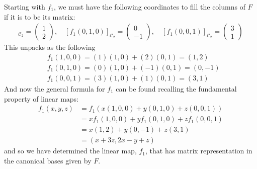 {\noindent Starting with $f_1$, we must have the following coordinates to fill the columns of $F$ if it is to be its matrix:
\begin{align*}
[f_1(1,0,0)]_{\mathcal{C}_2} = \begin{pmatrix} 1 \\ 2 \end{pmatrix}, \quad [f_1(0,1,0)]_{\mathcal{C}_2} = \begin{pmatrix} 0 \\-1 \end{pmatrix}, \quad [f_1(0,0,1)]_{\mathcal{C}_2} = \begin{pmatrix} 3 \\ 1 \end{pmatrix}
\end{align*}
This unpacks as the following
\begin{align*}
& f_1(1,0,0) = (1)(1,0) + (2)(0,1) = (1,2) \\
& f_1(0,1,0) = (0)(1,0) + (-1)(0,1) = (0,-1) \\
& f_1(0,0,1) = (3)(1,0) + (1)(0,1) = (3,1)
\end{align*}
And now the general formula for $f_1$ can be found recalling the fundamental property of linear maps:
\begin{align*}
f_1(x,y,z) &= f_1(x(1,0,0) + y(0,1,0) + z(0,0,1)) \\
           &= xf_1(1,0,0) + yf_1(0,1,0) + zf_1(0,0,1) \\
           &= x(1,2) + y(0,-1) + z(3,1) \\
           &= (x+3z,2x-y+z)
\end{align*}
and so we have determined the linear map, $f_1$, that has matrix representation in the canonical bases given by $F$. \\

}
